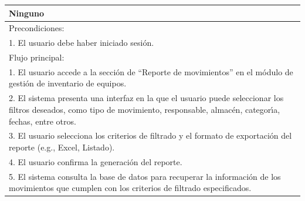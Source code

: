 \documentclass[stu, 12pt, letterpaper, donotrepeattitle, floatsintext, natbib]{apa7}
\begin{document}
\begin{longtable}{@{} p{16.5cm} @{}}
    Ninguno                                                                                                                                                                                                                                                                          \\ \midrule
    Precondiciones:                                                                                                                                                                                                                                                                  \\
    1. El usuario debe haber iniciado sesi\'on.                                                                                                                                                                                                                                      \\ \midrule
    Flujo principal:                                                                                                                                                                                                                                                                 \\
    1. El usuario accede a la secci\'on de ``Reporte de movimientos'' en el m\'odulo de gesti\'on de inventario de equipos.                                                                                                                                                          \\
    2. El sistema presenta una interfaz en la que el usuario puede seleccionar los filtros deseados, como tipo de movimiento, responsable, almac\'en, categor\'{\i}a, fechas, entre otros.                                                                                           \\
    3. El usuario selecciona los criterios de filtrado y el formato de exportaci\'on del reporte (e.g., Excel, Listado).                                                                                                                                                             \\
    4. El usuario confirma la generaci\'on del reporte.                                                                                                                                                                                                                              \\
    5. El sistema consulta la base de datos para recuperar la informaci\'on de los movimientos que cumplen con los criterios de filtrado especificados.                                                                                                                              \\

\end{longtable}
\end{document}
